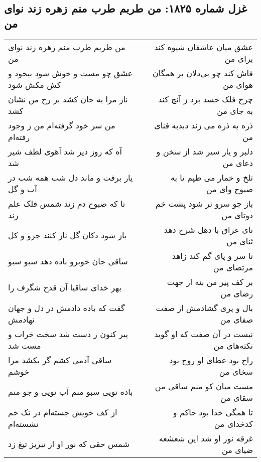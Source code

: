 \begin{center}
\section*{غزل شماره ۱۸۲۵: من طربم طرب منم زهره زند نوای من}
\label{sec:1825}
\begin{longtable}{l p{0.5cm} r}
من طربم طرب منم زهره زند نوای من
&&
عشق میان عاشقان شیوه کند برای من
\\
عشق چو مست و خوش شود بیخود و کش مکش شود
&&
فاش کند چو بی‌دلان بر همگان هوای من
\\
ناز مرا به جان کشد بر رخ من نشان کشد
&&
چرخ فلک حسد برد ز آنچ کند به جای من
\\
من سر خود گرفته‌ام من ز وجود رفته‌ام
&&
ذره به ذره می زند دبدبه فنای من
\\
آه که روز دیر شد آهوی لطف شیر شد
&&
دلبر و یار سیر شد از سخن و دعای من
\\
یار برفت و ماند دل شب همه شب در آب و گل
&&
تلخ و خمار می طپم تا به صبوح وای من
\\
تا که صبوح دم زند شمس فلک علم زند
&&
باز چو سرو تر شود پشت خم دوتای من
\\
باز شود دکان گل ناز کنند جزو و کل
&&
نای عراق با دهل شرح دهد ثنای من
\\
ساقی جان خوبرو باده دهد سبو سبو
&&
تا سر و پای گم کند زاهد مرتضای من
\\
بهر خدای ساقیا آن قدح شگرف را
&&
بر کف پیر من بنه از جهت رضای من
\\
گفت که باده دادمش در دل و جهان نهادمش
&&
بال و پری گشادمش از صفت صفای من
\\
پیر کنون ز دست شد سخت خراب و مست شد
&&
نیست در آن صفت که او گوید نکته‌های من
\\
ساقی آدمی کشم گر بکشد مرا خوشم
&&
راح بود عطای او روح بود سخای من
\\
باده تویی سبو منم آب تویی و جو منم
&&
مست میان کو منم ساقی من سقای من
\\
از کف خویش جسته‌ام در تک خم نشسته‌ام
&&
تا همگی خدا بود حاکم و کدخدای من
\\
شمس حقی که نور او از تبریز تیغ زد
&&
غرقه نور او شد این شعشعه ضیای من
\\
\end{longtable}
\end{center}
